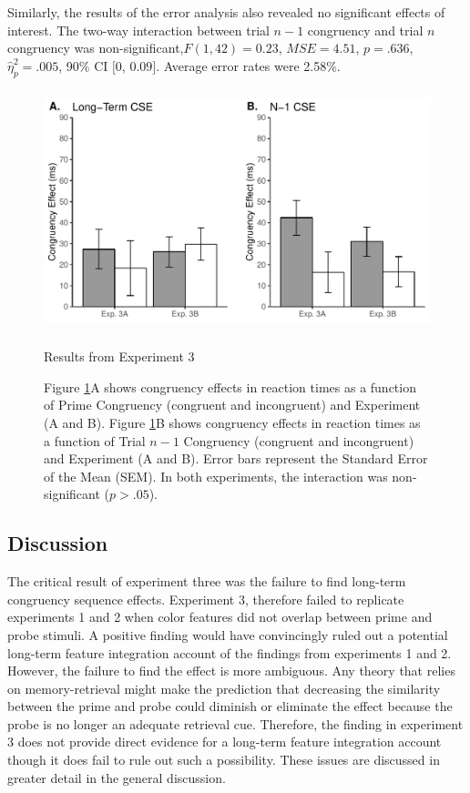 \documentclass[]{DissertateCUNY}
\begin{document}
Similarly, the results of the error analysis also revealed no
significant effects of interest. The two-way interaction between trial
\(n-1\) congruency and trial \(n\) congruency was
non-significant,\(F(1, 42) = 0.23\), \(\mathit{MSE} = 4.51\),
\(p = .636\), \(\hat{\eta}^2_p = .005\), 90\% CI \([0\), \(0.09]\).
Average error rates were 2.58\%.

\begin{figure}
  \centering
  \includegraphics[height=2.75in]{figures/MGfigure4.pdf}
  \caption{Results from Experiment 3}
  \caption*{Figure \ref{MG_figure4}A shows congruency effects in reaction times as a function of Prime Congruency (congruent and incongruent) and Experiment (A and B). Figure \ref{MG_figure4}B shows congruency effects in reaction times as a function of Trial $n-1$ Congruency (congruent and incongruent) and Experiment (A and B). Error bars represent the Standard Error of the Mean (SEM). In both experiments, the interaction was non-significant ($p > .05$).}

  \label{MG_figure4}
\end{figure}

\hypertarget{discussion-6}{%
\subsection{Discussion}\label{discussion-6}}

The critical result of experiment three was the failure to find
long-term congruency sequence effects. Experiment 3, therefore failed to
replicate experiments 1 and 2 when color features did not overlap
between prime and probe stimuli. A positive finding would have
convincingly ruled out a potential long-term feature integration account
of the findings from experiments 1 and 2. However, the failure to find
the effect is more ambiguous. Any theory that relies on memory-retrieval
might make the prediction that decreasing the similarity between the
prime and probe could diminish or eliminate the effect because the probe
is no longer an adequate retrieval cue. Therefore, the finding in
experiment 3 does not provide direct evidence for a long-term feature
integration account though it does fail to rule out such a possibility.
These issues are discussed in greater detail in the general discussion.
\end{document}
